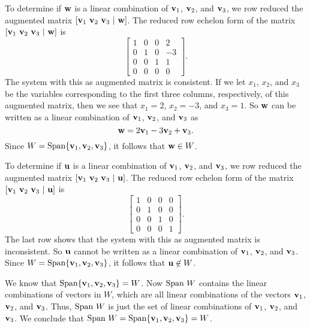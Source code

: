 \begin{example}
\item To determine if $\mathbf{w}$ is a linear combination of $\mathbf{v}_1$, $\mathbf{v}_2$, and $\mathbf{v}_3$, we row reduced the augmented matrix $[\mathbf{v}_1 \ \mathbf{v}_2 \ \mathbf{v}_3 \ | \ \mathbf{w}]$. The reduced row echelon form of the matrix $[\mathbf{v}_1 \ \mathbf{v}_2 \ \mathbf{v}_3 \ | \ \mathbf{w}]$ is
\[\left[ \begin{array}{ccc|r} 1&0&0&2 \\ 0&1&0&-3\\ 0&0&1&1 \\ 0&0&0&0 \end{array}\right].\]
The system with this as augmented matrix is consistent. If we let $x_1$, $x_2$, and $x_3$ be the variables corresponding to the first three columns, respectively, of this augmented matrix, then we see that $x_1 = 2$, $x_2 = -3$, and $x_3 = 1$. So $\mathbf{w}$ can be written as a linear combination of $\mathbf{v}_1$, $\mathbf{v}_2$, and $\mathbf{v}_3$ as 
\[\mathbf{w} = 2\mathbf{v}_1 -3\mathbf{v}_2 + \mathbf{v}_3.\]
Since $W = \text{Span}\{\mathbf{v}_1, \mathbf{v}_2, \mathbf{v}_3\}$, it follows that $\mathbf{w} \in W$. 

\item To determine if $\mathbf{u}$ is a linear combination of $\mathbf{v}_1$, $\mathbf{v}_2$, and $\mathbf{v}_3$, we row reduced the augmented matrix $[\mathbf{v}_1 \ \mathbf{v}_2 \ \mathbf{v}_3 \ | \ \mathbf{u}]$. The reduced row echelon form of the matrix $[\mathbf{v}_1 \ \mathbf{v}_2 \ \mathbf{v}_3 \ | \ \mathbf{u}]$ is
\[\left[ \begin{array}{ccc|c} 1&0&0&0 \\ 0&1&0&0\\ 0&0&1&0 \\ 0&0&0&1 \end{array}\right].\]
The last row shows that the system with this as augmented matrix is inconsistent. So $\mathbf{u}$ cannot be written as a linear combination of $\mathbf{v}_1$, $\mathbf{v}_2$, and $\mathbf{v}_3$. Since $W = \text{Span}\{\mathbf{v}_1, \mathbf{v}_2, \mathbf{v}_3\}$, it follows that $\mathbf{u} \not\in W$. 

\item We know that $\text{Span}\{\mathbf{v}_1, \mathbf{v}_2, \mathbf{v}_3\} = W$. Now $\text{Span} \ W$ contains the linear combinations of vectors in $W$, which are all linear combinations of the vectors $\mathbf{v}_1$, $\mathbf{v}_2$, and $\mathbf{v}_3$. Thus, $\text{Span} \ W$ is just the set of linear combinations of $\mathbf{v}_1$, $\mathbf{v}_2$, and $\mathbf{v}_3$. We conclude that  $\text{Span} \ W = \text{Span}\{\mathbf{v}_1, \mathbf{v}_2, \mathbf{v}_3\} = W$. 

\ea

\end{example}


